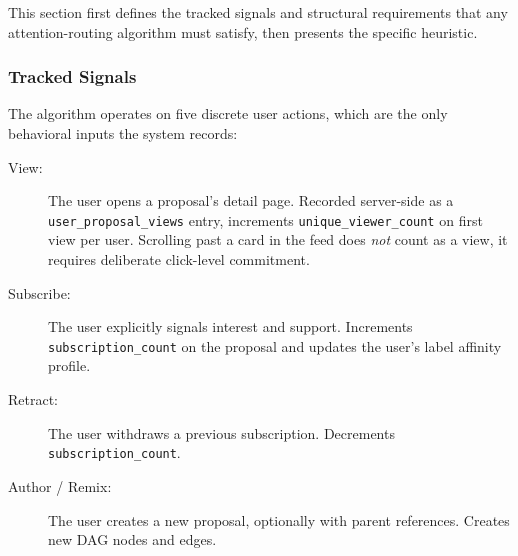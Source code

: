 \documentclass[a4paper, 12pt, twoside]{iviathesis}
\begin{document}
This section first defines the tracked signals and structural requirements that any attention-routing algorithm must satisfy, then presents the specific heuristic.

\subsubsection{Tracked Signals}
The algorithm operates on five discrete user actions, which are the only behavioral inputs the system records:
\begin{description}
    \item[View:] The user opens a proposal's detail page. Recorded server-side as a \texttt{user\_proposal\_views} entry, increments \texttt{unique\_viewer\_count} on first view per user. Scrolling past a card in the feed does \textit{not} count as a view, it requires deliberate click-level commitment.
    \item[Subscribe:] The user explicitly signals interest and support. Increments \texttt{subscription\_count} on the proposal and updates the user's label affinity profile.
    \item[Retract:] The user withdraws a previous subscription. Decrements \texttt{subscription\_count}.
    \item[Author / Remix:] The user creates a new proposal, optionally with parent references. Creates new DAG nodes and edges.
\end{description}
\end{document}
